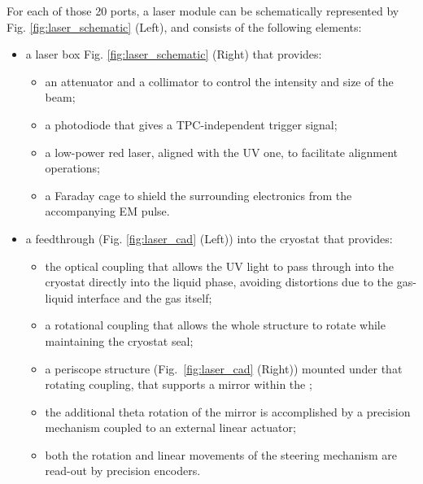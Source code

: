 For each of those 20 ports, a laser module can be schematically represented by Fig. \ref{fig:laser_schematic} (Left), and consists of the following elements:
\begin{itemize}
    \item a laser box Fig. \ref{fig:laser_schematic} (Right) that provides:
    \begin{itemize}
        \item an attenuator and a collimator to control the intensity and size of the beam;
        \item a photodiode that gives a TPC-independent trigger signal;
        \item a low-power red laser, aligned with the UV one, to facilitate alignment operations;
        \item a Faraday cage to shield the surrounding electronics from the accompanying EM pulse.
    \end{itemize}
    \item a feedthrough (Fig. \ref{fig:laser_cad} (Left)) into the cryostat that provides:
    \begin{itemize}
        \item the optical coupling that allows the UV light to pass through into the cryostat directly into the liquid phase, avoiding distortions due to the gas-liquid interface and the gas itself;
        \item a rotational coupling that allows the whole structure to rotate while maintaining the cryostat seal;
        \item a periscope structure (Fig.~\ref{fig:laser_cad} (Right)) mounted under that rotating coupling, that supports a mirror within the ;
        \item the additional theta rotation of the mirror is accomplished by a precision mechanism coupled to an external linear actuator;
        \item both the rotation and linear movements of the steering mechanism are read-out by precision encoders.
    \end{itemize}
    
\end{itemize}

